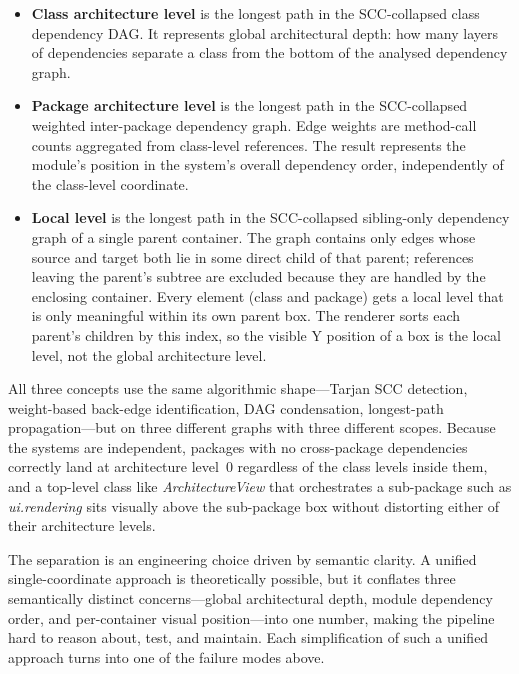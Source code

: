 \documentclass[a4paper,twoside]{article}
\begin{document}
\begin{itemize}
  \item \textbf{Class architecture level} is the longest path in the
        SCC-collapsed class dependency DAG. It represents global architectural
        depth: how many layers of dependencies separate a class from the
        bottom of the analysed dependency graph.
  \item \textbf{Package architecture level} is the longest path in the
        SCC-collapsed weighted inter-package dependency graph. Edge weights are
        method-call counts aggregated from class-level references. The result
        represents the module's position in the system's overall dependency
        order, independently of the class-level coordinate.
  \item \textbf{Local level} is the longest path in the SCC-collapsed
        sibling-only dependency graph of a single parent container. The graph
        contains only edges whose source and target both lie in some direct
        child of that parent; references leaving the parent's subtree are excluded
        because they are handled by the enclosing container. Every
        element (class and package) gets a local level that is only
        meaningful within its own parent box. The renderer sorts each parent's
        children by this index, so the visible Y position of a box is the
        local level, not the global architecture level.
\end{itemize}

All three concepts use the same algorithmic shape---Tarjan SCC detection,
weight-based back-edge identification, DAG condensation, longest-path
propagation---but on three different graphs with three different scopes.
Because the systems are independent, packages with no cross-package
dependencies correctly land at architecture level~0 regardless of the class
levels inside them, and a top-level class like \emph{ArchitectureView} that
orchestrates a sub-package such as \emph{ui.rendering} sits visually above the
sub-package box without distorting either of their architecture levels.

The separation is an engineering choice driven by semantic clarity. A unified
single-coordinate approach is theoretically possible, but it conflates three
semantically distinct concerns---global architectural depth, module dependency
order, and per-container visual position---into one number, making the pipeline
hard to reason about, test, and maintain. Each simplification of such
a unified approach turns into one of the failure modes above.
\end{document}
